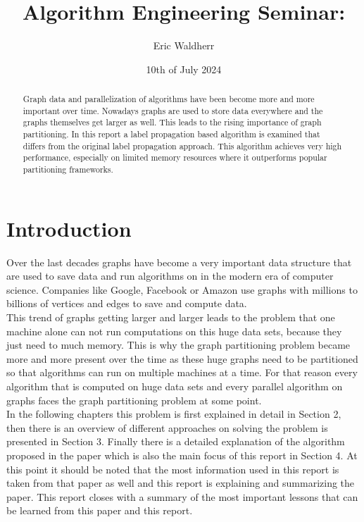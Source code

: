 \documentclass[acmsmall,nonacm,screen,review]{acmart}
\title{Algorithm Engineering Seminar: }
\author{Eric Waldherr}
\affiliation{%
  \institution{Heidelberg University}
  \streetaddress{Im Neuenheimer Feld 205}
  \city{Heidelberg}
  \state{Baden-Württemberg}
  \country{Germany}
  \postcode{69120}
}
\date{10th of July 2024}
\begin{document}
\begin{abstract}
Graph data and parallelization of algorithms have been become more and more important over time. Nowadays graphs are used to store data everywhere and the graphs themselves get larger as well. This leads to the rising importance of graph partitioning. In this report a label propagation based algorithm is examined that differs from the original label propagation approach. This algorithm achieves very high performance, especially on limited memory resources where it outperforms popular partitioning frameworks.
\end{abstract}
\maketitle

\section{Introduction}
Over the last decades graphs have become a very important data structure that are used to save data
and run algorithms on in the modern era of computer science. Companies like Google, Facebook or Amazon use graphs with millions to billions of vertices and edges to save and compute data.\\ 
This trend of graphs getting larger and larger leads to the problem that one machine alone can not run computations on this huge data sets, because they just need to much memory. This is why the graph partitioning problem became more and more present over the time as these huge graphs need to be partitioned so that algorithms can run on multiple machines at a time. For that reason every algorithm that is computed on huge data sets and every parallel algorithm on graphs faces the graph partitioning problem at some point.\\ 
In the following chapters this problem is first explained in detail in Section 2, then there is an overview of different approaches on solving the problem is presented in Section 3. Finally there is a detailed explanation of the algorithm proposed in the paper which is also the main focus of this report in Section 4. At this point it should be noted that the most information used in this report is taken from that paper as well and this report is explaining and summarizing the paper. This report closes with a summary of the most important lessons that can be learned from this paper and this report.
\end{document}
